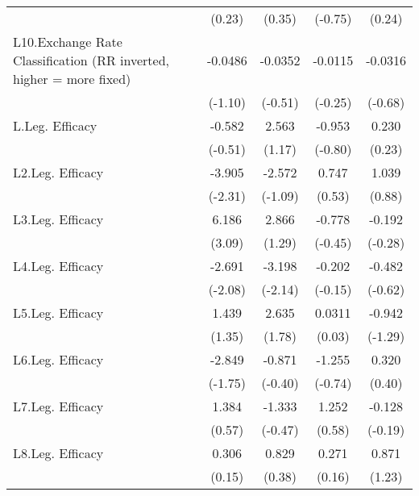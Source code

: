 {\begin{longtable}{l*{4}{c}}
                &   (0.23)         &   (0.35)         &  (-0.75)         &   (0.24)         \\
[1em]
L10.Exchange Rate Classification (RR inverted, higher = more fixed)&  -0.0486         &  -0.0352         &  -0.0115         &  -0.0316         \\
                &  (-1.10)         &  (-0.51)         &  (-0.25)         &  (-0.68)         \\
[1em]
L.Leg. Efficacy &   -0.582         &    2.563         &   -0.953         &    0.230         \\
                &  (-0.51)         &   (1.17)         &  (-0.80)         &   (0.23)         \\
[1em]
L2.Leg. Efficacy&   -3.905\sym{*}  &   -2.572         &    0.747         &    1.039         \\
                &  (-2.31)         &  (-1.09)         &   (0.53)         &   (0.88)         \\
[1em]
L3.Leg. Efficacy&    6.186\sym{**} &    2.866         &   -0.778         &   -0.192         \\
                &   (3.09)         &   (1.29)         &  (-0.45)         &  (-0.28)         \\
[1em]
L4.Leg. Efficacy&   -2.691\sym{*}  &   -3.198\sym{*}  &   -0.202         &   -0.482         \\
                &  (-2.08)         &  (-2.14)         &  (-0.15)         &  (-0.62)         \\
[1em]
L5.Leg. Efficacy&    1.439         &    2.635         &   0.0311         &   -0.942         \\
                &   (1.35)         &   (1.78)         &   (0.03)         &  (-1.29)         \\
[1em]
L6.Leg. Efficacy&   -2.849         &   -0.871         &   -1.255         &    0.320         \\
                &  (-1.75)         &  (-0.40)         &  (-0.74)         &   (0.40)         \\
[1em]
L7.Leg. Efficacy&    1.384         &   -1.333         &    1.252         &   -0.128         \\
                &   (0.57)         &  (-0.47)         &   (0.58)         &  (-0.19)         \\
[1em]
L8.Leg. Efficacy&    0.306         &    0.829         &    0.271         &    0.871         \\
                &   (0.15)         &   (0.38)         &   (0.16)         &   (1.23)         \\

\end{longtable}}
